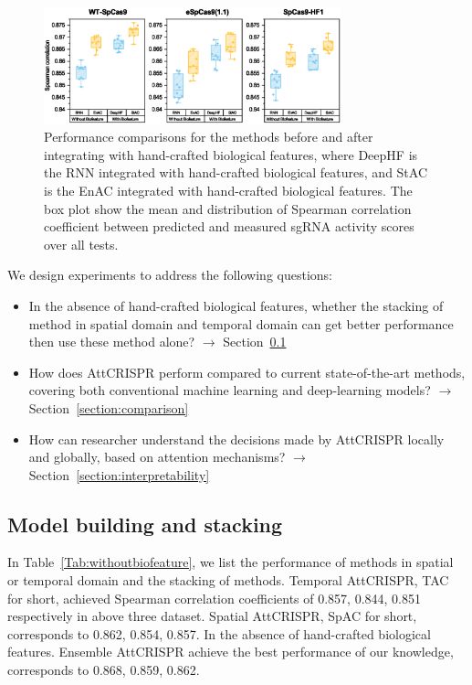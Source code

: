 \documentclass{bioinfo}
\begin{document}
\begin{figure}[!tpb]%
    \centerline{\includegraphics[width=86mm]{baselinewithbiofeat.eps}}
    \caption{
Performance comparisons for the methods before and after integrating with hand-crafted biological features, 
where DeepHF is the RNN integrated with hand-crafted biological features, 
and StAC is the EnAC integrated with hand-crafted biological features. 
The box plot show the mean and distribution of Spearman correlation coefficient between predicted and measured sgRNA activity scores over all tests.
}\label{fig:07}
\end{figure}

We design experiments to address the following questions:
\begin{itemize}
    \item 
    In the absence of hand-crafted biological features, whether the stacking of method in spatial domain and temporal domain can get better performance then use these method alone? 
    $\rightarrow$ Section~\ref{section:stacking}
    \item 
    How does AttCRISPR perform compared to current state-of-the-art methods, covering both conventional machine learning and deep-learning models? 
    $\rightarrow$ Section~\ref{section:comparison}
    \item 
    How can researcher understand the decisions made by AttCRISPR locally and globally, based on attention mechanisms? 
    $\rightarrow$ Section~\ref{section:interpretability}
    \vspace*{1pt}
\end{itemize}

\subsection{Model building and stacking}\label{section:stacking}

In Table~\ref{Tab:withoutbiofeature}, we list the performance of methods in spatial or temporal domain and the stacking of methods. 
Temporal AttCRISPR, TAC for short, achieved Spearman correlation coefficients of 0.857, 0.844, 0.851 respectively in above three dataset. 
Spatial AttCRISPR, SpAC for short, corresponds to 0.862, 0.854, 0.857. In the absence of hand-crafted biological features. 
Ensemble AttCRISPR achieve the best performance of our knowledge, corresponds to 0.868, 0.859, 0.862. 
\end{document}
